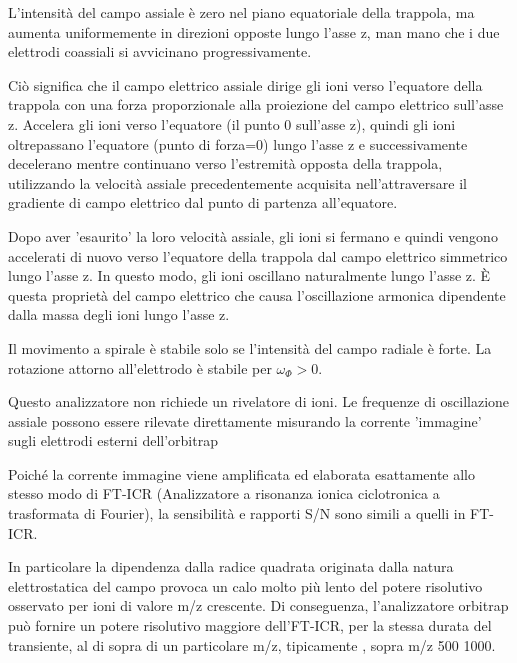 L'intensità del campo assiale è zero nel piano equatoriale della trappola, ma aumenta uniformemente in direzioni opposte lungo l'asse z, man mano che i due elettrodi coassiali si avvicinano progressivamente.

Ciò significa che il campo elettrico assiale dirige gli ioni verso l'equatore della trappola con una forza proporzionale alla proiezione del campo elettrico sull'asse z.
Accelera gli ioni verso l'equatore (il punto 0 sull'asse z), quindi gli ioni oltrepassano l'equatore (punto di forza=0) lungo l'asse z e successivamente decelerano mentre continuano verso l'estremità opposta della trappola, utilizzando la velocità assiale precedentemente acquisita nell'attraversare il gradiente di campo elettrico dal punto di partenza
all'equatore.


Dopo aver 'esaurito' la loro velocità assiale, gli ioni si fermano e quindi vengono accelerati di nuovo verso l'equatore della trappola dal campo elettrico simmetrico lungo l'asse z.
In questo modo, gli ioni oscillano naturalmente lungo l'asse z.
È questa proprietà del campo elettrico che causa l'oscillazione armonica dipendente dalla massa degli ioni lungo l'asse z.

Il movimento a spirale è stabile solo se l'intensità del campo radiale è forte.
La rotazione attorno all'elettrodo è stabile per $\omega_\Phi > 0 $.

Questo analizzatore non richiede un rivelatore di ioni.
Le frequenze di oscillazione assiale possono essere rilevate direttamente misurando la corrente 'immagine' sugli elettrodi esterni dell'orbitrap

Poiché la corrente immagine viene amplificata ed elaborata esattamente allo stesso modo di FT-ICR (Analizzatore a risonanza ionica ciclotronica a trasformata di Fourier), la sensibilità e rapporti S/N sono simili a quelli in FT-ICR.


In particolare la dipendenza dalla radice quadrata originata dalla natura elettrostatica del campo provoca un calo molto più lento del potere risolutivo osservato per ioni di valore m/z crescente.
Di conseguenza, l'analizzatore orbitrap può fornire un potere risolutivo maggiore dell'FT-ICR, per la stessa durata del transiente, al di sopra di un particolare m/z, tipicamente , sopra m/z 500 1000.

